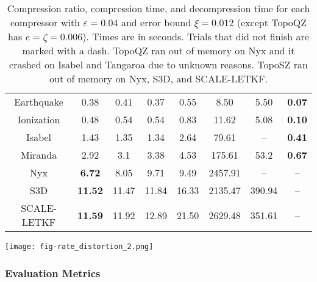 \begin{table}[!t]
{\begin{tabular}{cccccccc}
Earthquake  & 0.38             & 0.41    & 0.37            & 0.55           & \multicolumn{1}{c|}{8.50}       & 5.50               & \textbf{0.07}   \\
Ionization  & 0.48             & 0.54    & 0.54            & 0.83           & \multicolumn{1}{c|}{11.62}      & 5.08               & \textbf{0.10}   \\
Isabel      & 1.43             & 1.35    & 1.34            & 2.64           & \multicolumn{1}{c|}{79.61}      & --                 & \textbf{0.41}   \\
Miranda     & 2.92             & 3.1     & 3.38            & 4.53           & \multicolumn{1}{c|}{175.61}     & 53.2               & \textbf{0.67}   \\
Nyx         & \textbf{6.72}    & 8.05    & 9.71            & 9.49           & \multicolumn{1}{c|}{2457.91}    & --                 & --              \\
S3D         & \textbf{11.52}   & 11.47   & 11.84           & 16.33          & \multicolumn{1}{c|}{2135.47}    & 390.94             & --              \\
SCALE-LETKF & \textbf{11.59}   & 11.92   & 12.89           & 21.50          & \multicolumn{1}{c|}{2629.48}    & 351.61             & --              \\ \hline
\end{tabular}
}
\vspace{-2mm}
\caption{Compression ratio, compression time, and decompression time for each compressor with $\varepsilon = 0.04$ and error bound $\xi = 0.012$ (except TopoQZ has $e = \zeta = 0.006$).
Times are in seconds.
Trials that did not finish are marked with a dash. 
TopoQZ ran out of memory on Nyx and it crashed on Isabel and Tangaroa due to unknown reasons. 
TopoSZ ran out of memory on Nyx, S3D, and SCALE-LETKF. 
}
\label{tab:compression-task}

\texttt{[image: fig-rate\_distortion\_2.png]}
    \vspace{-4mm}
    \label{fig:reconstruction-quality}
    \vspace{-4mm}
\end{table}

\subsubsection{Evaluation Metrics}
\label{sec:augmented-compressors-evaluation-metrics}

